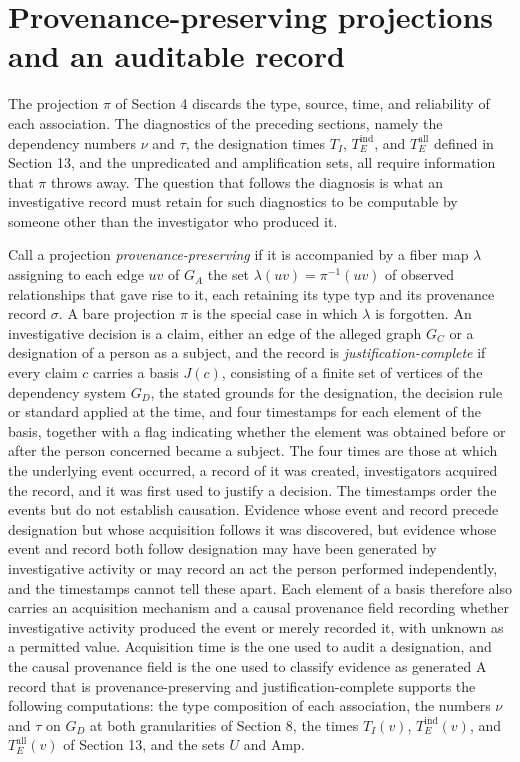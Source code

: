 \documentclass[11pt]{article}
\theoremstyle{definition}
\theoremstyle{remark}
\begin{document}
\section{Provenance-preserving projections and an auditable record}

The projection $\pi$ of Section 4 discards the type, source, time, and reliability of each association. The diagnostics of the preceding sections, namely the dependency numbers $\nu$ and $\tau$, the designation times $T_I$, $T_E^{\mathrm{ind}}$, and $T_E^{\mathrm{all}}$ defined in Section 13, and the unpredicated and amplification sets, all require information that $\pi$ throws away. The question that follows the diagnosis is what an investigative record must retain for such diagnostics to be computable by someone other than the investigator who produced it.

Call a projection \emph{provenance-preserving} if it is accompanied by a fiber map $\lambda$ assigning to each edge $uv$ of $G_A$ the set $\lambda(uv) = \pi^{-1}(uv)$ of observed relationships that gave rise to it, each retaining its type $\mathrm{typ}$ and its provenance record $\sigma$. A bare projection $\pi$ is the special case in which $\lambda$ is forgotten. An investigative decision is a claim, either an edge of the alleged graph $G_C$ or a designation of a person as a subject, and the record is \emph{justification-complete} if every claim $c$ carries a basis $J(c)$, consisting of a finite set of vertices of the dependency system $G_D$, the stated grounds for the designation, the decision rule or standard applied at the time, and four timestamps for each element of the basis, together with a flag indicating whether the element was obtained before or after the person concerned became a subject. The four times are those at which the underlying event occurred, a record of it was created, investigators acquired the record, and it was first used to justify a decision. The timestamps order the events but do not establish causation. Evidence whose event and record precede designation but whose acquisition follows it was discovered, but evidence whose event and record both follow designation may have been generated by investigative activity or may record an act the person performed independently, and the timestamps cannot tell these apart. Each element of a basis therefore also carries an acquisition mechanism and a causal provenance field recording whether investigative activity produced the event or merely recorded it, with unknown as a permitted value. Acquisition time is the one used to audit a designation, and the causal provenance field is the one used to classify evidence as generated A record that is provenance-preserving and justification-complete supports the following computations: the type composition of each association, the numbers $\nu$ and $\tau$ on $G_D$ at both granularities of Section 8, the times $T_I(v)$, $T_E^{\mathrm{ind}}(v)$, and $T_E^{\mathrm{all}}(v)$ of Section 13, and the sets $U$ and $\mathrm{Amp}$.
\end{document}
